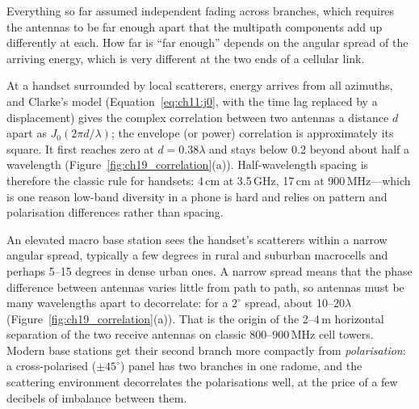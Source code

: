 Everything so far assumed independent fading across branches, which requires the antennas to be
far enough apart that the multipath components add up differently at each. How far is ``far
enough'' depends on the angular spread of the arriving energy, which is very different at the two
ends of a cellular link.


At a handset surrounded by local scatterers, energy arrives from all azimuths, and Clarke's model
(Equation~\eqref{eq:ch11:j0}, with the time lag replaced by a displacement) gives the complex
correlation between two antennas a distance $d$ apart as $J_0(2\pi d/\lambda)$; the envelope (or
power) correlation is approximately its square. It first reaches zero at $d=0.38\lambda$ and stays
below 0.2 beyond about half a wavelength (Figure~\ref{fig:ch19_correlation}(a)). Half-wavelength
spacing is therefore the classic rule for handsets: 4\,cm at 3.5\,GHz, 17\,cm at 900\,MHz---which is
one reason low-band diversity in a phone is hard and relies on pattern and polarisation
differences rather than spacing.

An elevated macro base station sees the handset's scatterers within a narrow angular spread,
typically a few degrees in rural and suburban macrocells and perhaps 5--15 degrees in dense
urban ones. A narrow spread means that the phase difference between antennas varies little from
path to path, so antennas must be many wavelengths apart to decorrelate: for a $2^\circ$ spread,
about 10--20$\lambda$ (Figure~\ref{fig:ch19_correlation}(a)). That is the origin of the 2--4\,m
horizontal separation of the two receive antennas on classic 800--900\,MHz cell towers. Modern
base stations get their second branch more compactly from \emph{polarisation}: a cross-polarised
($\pm45^\circ$) panel has two branches in one radome, and the scattering environment decorrelates
the polarisations well, at the price of a few decibels of imbalance between them.

